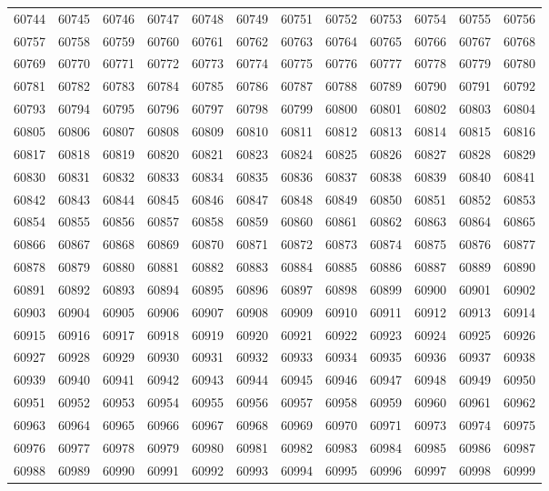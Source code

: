 \begin{center}
\begin{longtable}{llllllllllll}
60744 &60745 &60746 &60747 &60748 &60749 &60751 &60752 &60753 &60754 &60755 &60756 \\
60757 &60758 &60759 &60760 &60761 &60762 &60763 &60764 &60765 &60766 &60767 &60768 \\
60769 &60770 &60771 &60772 &60773 &60774 &60775 &60776 &60777 &60778 &60779 &60780 \\
60781 &60782 &60783 &60784 &60785 &60786 &60787 &60788 &60789 &60790 &60791 &60792 \\
60793 &60794 &60795 &60796 &60797 &60798 &60799 &60800 &60801 &60802 &60803 &60804 \\
60805 &60806 &60807 &60808 &60809 &60810 &60811 &60812 &60813 &60814 &60815 &60816 \\
60817 &60818 &60819 &60820 &60821 &60823 &60824 &60825 &60826 &60827 &60828 &60829 \\
60830 &60831 &60832 &60833 &60834 &60835 &60836 &60837 &60838 &60839 &60840 &60841 \\
60842 &60843 &60844 &60845 &60846 &60847 &60848 &60849 &60850 &60851 &60852 &60853 \\
60854 &60855 &60856 &60857 &60858 &60859 &60860 &60861 &60862 &60863 &60864 &60865 \\
60866 &60867 &60868 &60869 &60870 &60871 &60872 &60873 &60874 &60875 &60876 &60877 \\
60878 &60879 &60880 &60881 &60882 &60883 &60884 &60885 &60886 &60887 &60889 &60890 \\
60891 &60892 &60893 &60894 &60895 &60896 &60897 &60898 &60899 &60900 &60901 &60902 \\
60903 &60904 &60905 &60906 &60907 &60908 &60909 &60910 &60911 &60912 &60913 &60914 \\
60915 &60916 &60917 &60918 &60919 &60920 &60921 &60922 &60923 &60924 &60925 &60926 \\
60927 &60928 &60929 &60930 &60931 &60932 &60933 &60934 &60935 &60936 &60937 &60938 \\
60939 &60940 &60941 &60942 &60943 &60944 &60945 &60946 &60947 &60948 &60949 &60950 \\
60951 &60952 &60953 &60954 &60955 &60956 &60957 &60958 &60959 &60960 &60961 &60962 \\
60963 &60964 &60965 &60966 &60967 &60968 &60969 &60970 &60971 &60973 &60974 &60975 \\
60976 &60977 &60978 &60979 &60980 &60981 &60982 &60983 &60984 &60985 &60986 &60987 \\
60988 &60989 &60990 &60991 &60992 &60993 &60994 &60995 &60996 &60997 &60998 &60999 \\

\end{longtable}
\end{center}
